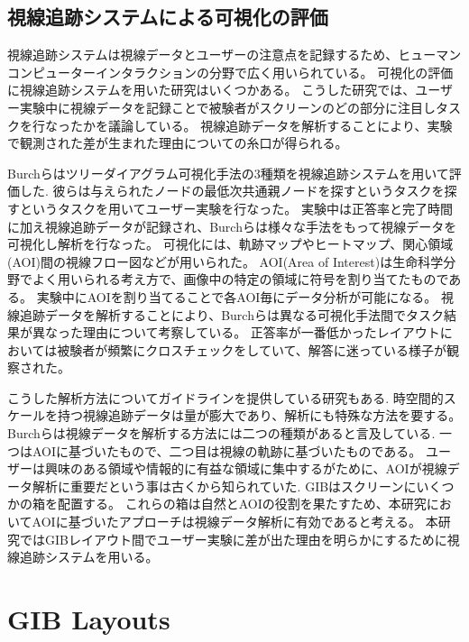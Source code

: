 \documentclass{kuee}
\begin{document}
\section{視線追跡システムによる可視化の評価}
\label{sec:evaluation_with_eyetracking}
視線追跡システムは視線データとユーザーの注意点を記録するため、ヒューマンコンピューターインタラクションの分野で広く用いられている\cite{andrienko2012visual,duchowski2007eye,kurzhals2014evaluating}。
可視化の評価に視線追跡システムを用いた研究はいくつかある\cite{burch2011evaluation',pohl2009comparing,netzel2014comparative,jianu2014display,7539393}。
こうした研究では、ユーザー実験中に視線データを記録ことで被験者がスクリーンのどの部分に注目しタスクを行なったかを議論している。
視線追跡データを解析することにより、実験で観測された差が生まれた理由についての糸口が得られる。

Burchらはツリーダイアグラム可視化手法の3種類を視線追跡システムを用いて評価した\cite{burch2011evaluation}.
彼らは与えられたノードの最低次共通親ノードを探すというタスクを探すというタスクを用いてユーザー実験を行なった。
実験中は正答率と完了時間に加え視線追跡データが記録され、Burchらは様々な手法をもって視線データを可視化し解析を行なった。
可視化には、軌跡マップやヒートマップ、関心領域(AOI)間の視線フロー図などが用いられた。
AOI(Area of Interest)は生命科学分野でよく用いられる考え方で、画像中の特定の領域に符号を割り当てたものである。
実験中にAOIを割り当てることで各AOI毎にデータ分析が可能になる。
視線追跡データを解析することにより、Burchらは異なる可視化手法間でタスク結果が異なった理由について考察している。
正答率が一番低かったレイアウトにおいては被験者が頻繁にクロスチェックをしていて、解答に迷っている様子が観察された。

こうした解析方法についてガイドラインを提供している研究もある\cite{andrienko2012visual,kurzhals2014evaluating,duchowski2007eye}.
時空間的スケールを持つ視線追跡データは量が膨大であり、解析にも特殊な方法を要する。
Burchらは視線データを解析する方法には二つの種類があると言及している\cite{Burch2013VisualTS}.
一つはAOIに基づいたもので、二つ目は視線の軌跡に基づいたものである。
ユーザーは興味のある領域や情報的に有益な領域に集中するがために、AOIが視線データ解析に重要だという事は古くから知られていた\cite{yarbus1967eye}.
GIBはスクリーンにいくつかの箱を配置する。
これらの箱は自然とAOIの役割を果たすため、本研究においてAOIに基づいたアプローチは視線データ解析に有効であると考える。
本研究ではGIBレイアウト間でユーザー実験に差が出た理由を明らかにするために視線追跡システムを用いる。

\chapter{GIB Layouts}
\label{chap:GIBs}
\end{document}
